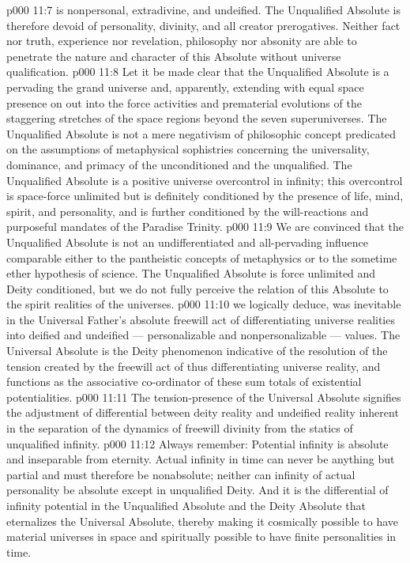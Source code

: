 \vs p000 11:7 \bibnobreakspace {} is nonpersonal, extradivine, and undeified. The Unqualified Absolute is therefore devoid of personality, divinity, and all creator prerogatives. Neither fact nor truth, experience nor revelation, philosophy nor absonity are able to penetrate the nature and character of this Absolute without universe qualification.
\vs p000 11:8 Let it be made clear that the Unqualified Absolute is a  pervading the grand universe and, apparently, extending with equal space presence on out into the force activities and prematerial evolutions of the staggering stretches of the space regions beyond the seven superuniverses. The Unqualified Absolute is not a mere negativism of philosophic concept predicated on the assumptions of metaphysical sophistries concerning the universality, dominance, and primacy of the unconditioned and the unqualified. The Unqualified Absolute is a positive universe overcontrol in infinity; this overcontrol is space\hyp{}force unlimited but is definitely conditioned by the presence of life, mind, spirit, and personality, and is further conditioned by the will\hyp{}reactions and purposeful mandates of the Paradise Trinity.
\vs p000 11:9 We are convinced that the Unqualified Absolute is not an undifferentiated and all\hyp{}pervading influence comparable either to the pantheistic concepts of metaphysics or to the sometime ether hypothesis of science. The Unqualified Absolute is force unlimited and Deity conditioned, but we do not fully perceive the relation of this Absolute to the spirit realities of the universes.
\vs p000 11:10 \bibnobreakspace {} we logically deduce, was inevitable in the Universal Father’s absolute freewill act of differentiating universe realities into deified and undeified --- personalizable and nonpersonalizable --- values. The Universal Absolute is the Deity phenomenon indicative of the resolution of the tension created by the freewill act of thus differentiating universe reality, and functions as the associative co\hyp{}ordinator of these sum totals of existential potentialities.
\vs p000 11:11 \pc The tension\hyp{}presence of the Universal Absolute signifies the adjustment of differential between deity reality and undeified reality inherent in the separation of the dynamics of freewill divinity from the statics of unqualified infinity.
\vs p000 11:12 \pc Always remember: Potential infinity is absolute and inseparable from eternity. Actual infinity in time can never be anything but partial and must therefore be nonabsolute; neither can infinity of actual personality be absolute except in unqualified Deity. And it is the differential of infinity potential in the Unqualified Absolute and the Deity Absolute that eternalizes the Universal Absolute, thereby making it cosmically possible to have material universes in space and spiritually possible to have finite personalities in time.
